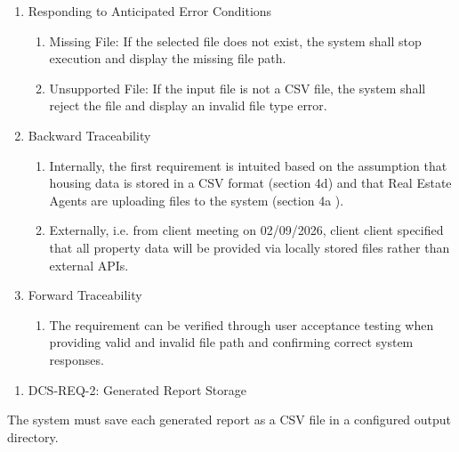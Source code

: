 \begin{enumerate}
\def\labelenumi{\alph{enumi}.}
\item
  Responding to Anticipated Error Conditions

  \begin{enumerate}
  \def\labelenumii{\roman{enumii}.}
  \item
    Missing File: If the selected file does not exist, the system shall
    stop execution and display the missing file path.
  \item
    Unsupported File: If the input file is not a CSV file, the system
    shall reject the file and display an invalid file type error.
  \end{enumerate}
\item
  Backward Traceability

  \begin{enumerate}
  \def\labelenumii{\roman{enumii}.}
  \item
    Internally, the first requirement is intuited based on the
    assumption that housing data is stored in a CSV format (section 4d)
    and that Real Estate Agents are uploading files to the system
    (section 4a ).
  \item
    Externally, i.e. from client meeting on 02/09/2026, client client
    specified that all property data will be provided via locally stored
    files rather than external APIs.
  \end{enumerate}
\item
  Forward Traceability

  \begin{enumerate}
  \def\labelenumii{\roman{enumii}.}
  \item
    The requirement can be verified through user acceptance testing when
    providing valid and invalid file path and confirming correct system
    responses.
  \end{enumerate}
\end{enumerate}

\begin{enumerate}
\def\labelenumi{\Roman{enumi})}
\setcounter{enumi}{3}
\item
  DCS-REQ-2: Generated Report Storage
\end{enumerate}

The system must save each generated report as a CSV file in a configured
output directory.

